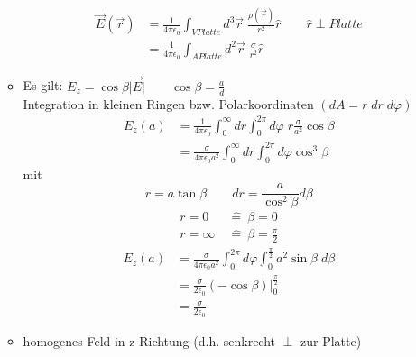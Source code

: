 \documentclass[titlepage,12pt,a4paper,ngerman]{report}
\begin{document}
\begin{itemize}
\begin{itemize}
\begin{align*}
\vec{E}(\vec{r}) &= \frac{1}{4 \pi \epsilon_0} \int_{V Platte} d^3 \vec{r}\; \frac{\rho ( \vec{r})}{r^2} \hat{r}\qquad \hat{r} \perp Platte\\
&= \frac{1}{4\pi\epsilon_0} \int_{A Platte} d^2 \vec{r} \; \frac{\sigma}{r^2} \hat{r}
\end{align*}

\item Es gilt: $E_z = \cos\beta \vert \vec{E} \vert \qquad \cos\beta = \frac{a}{d}$\\
Integration in kleinen Ringen bzw. Polarkoordinaten
$(dA = r \; dr \; d\varphi)$
\begin{align*}
E_z(a) &= \frac{1}{4\pi\epsilon_0} \int_0^\infty dr \int_0^{2\pi} d\varphi \; r \frac{\sigma}{a^2} \cos \beta\\[15pt]
&= \frac{\sigma}{4 \pi \epsilon_0a^2} \int_0^\infty dr \int_0^{2\pi} d\varphi \cos^3\beta
\end{align*}
mit $$ r=a\tan \beta\qquad dr = \frac{a}{\cos^2 \beta} d\beta $$
\begin{align*}
r=0 &\ \widehat{ = }\ \beta = 0\\
r=\infty &\ \widehat{ = }\ \beta = \frac{\pi}{2}
\end{align*}
\begin{align*}
E_z(a) &=  \frac{\sigma}{4 \pi \epsilon_0a^2} \int_0^{2\pi} d\varphi \int_0^{\frac{\pi}{2}} a^2 \sin\beta \; d\beta\\
&= \frac{\sigma}{2\epsilon_0} (-\cos\beta) \bigg|_{0}^{\frac{\pi}{2}}\\
&= \frac{\sigma}{2\epsilon_0}
\end{align*}
\item homogenes Feld in z-Richtung (d.h. senkrecht $\perp$ zur Platte)
\end{itemize}
\end{itemize}

\end{document}
